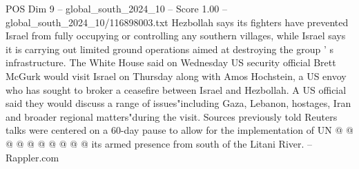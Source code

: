 \begin{textsample}{POS Dim 9 – global\_south\_2024\_10 – Score 1.00 – global\_south\_2024\_10/116898003.txt}
Hezbollah says its fighters have prevented Israel from fully occupying or controlling any southern villages, while Israel says it is carrying out limited ground operations aimed at destroying the group ' s infrastructure.
The White House said on Wednesday US security official Brett McGurk would visit Israel on Thursday along with Amos Hochstein, a US envoy who has sought to broker a ceasefire between Israel and Hezbollah.
A US official said they would discuss a range of issues"including Gaza, Lebanon, hostages, Iran and broader regional matters"during the visit.
Sources previously told Reuters talks were centered on a 60-day pause to allow for the implementation of UN @ @ @ @ @ @ @ @ @ @ its armed presence from south of the Litani River. -- Rappler.com

\end{textsample}
